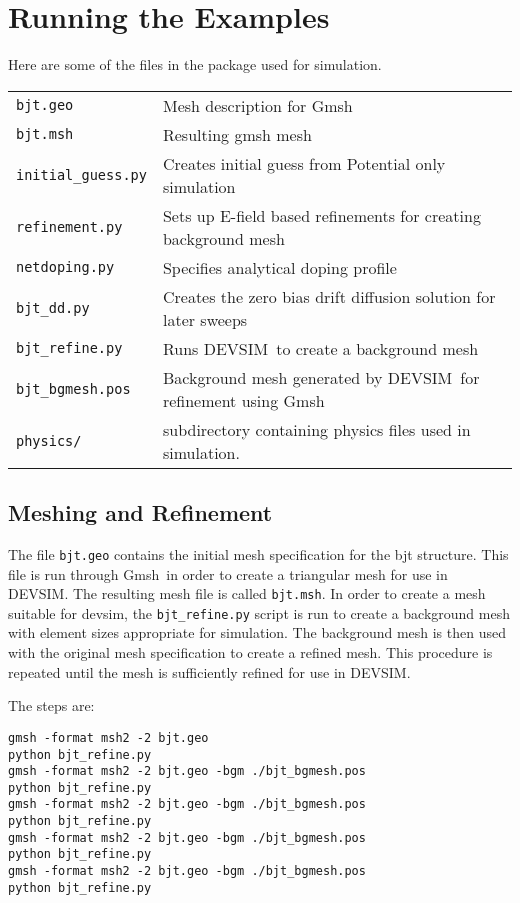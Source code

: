 \documentclass[11pt]{article}
\newcommand{\devsim}{\mbox{DEVSIM}}
\newcommand{\gmsh}{\mbox{Gmsh}}
\begin{document}
\section{Running the Examples}
\begin{minipage}{\textwidth}
Here are some of the files in the package used for simulation.

\begin{tabular}{ll}
\texttt{bjt.geo} & Mesh description for \gmsh\\
\texttt{bjt.msh} & Resulting gmsh mesh\\
\texttt{initial\_guess.py}  & Creates initial guess from Potential only simulation\\
\texttt{refinement.py}  & Sets up E-field based refinements for creating background mesh\\
\texttt{netdoping.py}  & Specifies analytical doping profile\\
\texttt{bjt\_dd.py} & Creates the zero bias drift diffusion solution for later sweeps\\
\texttt{bjt\_refine.py} & Runs \devsim\ to create a background mesh\\
\texttt{bjt\_bgmesh.pos} & Background mesh generated by \devsim\ for refinement using \gmsh\\
\texttt{physics/} & subdirectory containing physics files used in simulation.
\end{tabular}
\end{minipage}

\subsection{Meshing and Refinement}

The file \texttt{bjt.geo} contains the initial mesh specification for the bjt structure.  This file is run through \gmsh\ in order to create a triangular mesh for use in \devsim.  The resulting mesh file is called \texttt{bjt.msh}.  In order to create a mesh suitable for devsim, the \texttt{bjt\_refine.py} script is run to create a background mesh with element sizes appropriate for simulation.  The background mesh is then used with the original mesh specification to create a refined mesh.  This procedure is repeated until the mesh is sufficiently refined for use in \devsim.

\begin{minipage}{\textwidth}
The steps are:
\begin{verbatim}
gmsh -format msh2 -2 bjt.geo
python bjt_refine.py
gmsh -format msh2 -2 bjt.geo -bgm ./bjt_bgmesh.pos
python bjt_refine.py
gmsh -format msh2 -2 bjt.geo -bgm ./bjt_bgmesh.pos
python bjt_refine.py
gmsh -format msh2 -2 bjt.geo -bgm ./bjt_bgmesh.pos
python bjt_refine.py
gmsh -format msh2 -2 bjt.geo -bgm ./bjt_bgmesh.pos
python bjt_refine.py
\end{verbatim}
\end{minipage}
\\~\\
\end{document}
